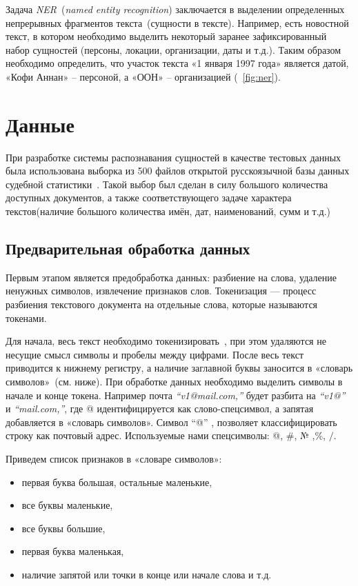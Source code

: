 \documentclass{csmathnotes}
\begin{document}
Задача \emph{NER}~(\emph{named entity recognition}) заключается в выделении определенных непрерывных фрагментов текста~(сущности в тексте). Например, есть новостной текст, в котором необходимо выделить некоторый заранее зафиксированный набор сущностей (персоны, локации, организации, даты и т.д.). Таким образом необходимо определить, что участок текста «1 января 1997 года» является датой, «Кофи Аннан» – персоной, а «ООН» – организацией (~\ref{fig:ner}). 

\section*{Данные}
При разработке системы распознавания сущностей в качестве тестовых данных была использована выборка из 500 файлов открытой русскоязычной базы данных судебной статистики~\cite{CourtsData}. Такой выбор был сделан в силу большого количества доступных документов, а также соответствующего задаче характера текстов(наличие большого количества имён, дат, наименований, сумм и т.д.)

\subsection*{Предварительная обработка данных}
Первым этапом является предобработка данных: разбиение на слова, удаление ненужных символов, извлечение признаков слов. 
Токенизация — процесс разбиения текстового документа на отдельные слова, которые называются токенами.


Для начала, весь текст необходимо токенизировать~\cite{Ner}, при этом удаляются не несущие смысл символы и пробелы между цифрами. После весь текст приводится к нижнему регистру, а наличие заглавной буквы заносится в «словарь символов»~(см. ниже).
При обработке данных необходимо выделить символы в начале и конце токена.  Например почта \emph{“v1@mail.com,”} будет разбита на \emph{“v1@”} и \emph{“mail.com,”}, где @ идентифицируется как слово-спецсимвол, а запятая добавляется в «словарь символов». Символ “@” , позволяет классифицировать строку как почтовый адрес. Используемые нами спецсимволы: @, \#, № ,\%, $/$.


Приведем список признаков в «словаре символов»:
\begin{itemize}
	\item первая буква большая, остальные маленькие,
	\item все буквы маленькие,
	\item все буквы большие,
	\item первая буква маленькая,
	\item наличие запятой или точки в конце или начале слова и т.д.
\end{itemize}
\end{document}
